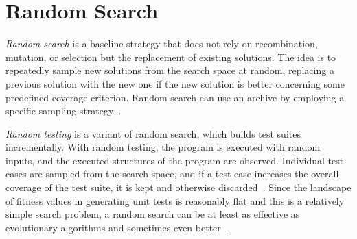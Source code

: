 \documentclass[paper=a4,%
  twoside,%
  BCOR4mm,%
  abstract=true,%
  toc=bibliography,%
  chapterprefix=true,%
  toc=bibliographynumbered,%
  open=right,%
  english,%
  pagesize=pdftex]{scrreprt}
\begin{document}
\section{Random Search}
\emph{Random search} is a baseline strategy that does not rely on recombination, mutation, or selection but the replacement of existing solutions. The idea is to repeatedly sample new solutions from the search space at random, replacing a previous solution with the new one if the new solution is better concerning some predefined coverage criterion. Random search can use an archive by employing a specific sampling strategy~\cite{Campos2017}. 

\emph{Random testing} is a variant of random search, which builds test suites incrementally. With random testing, the program is executed with random inputs, and the executed structures of the program are observed. Individual test cases are sampled from the search space, and if a test case increases the overall coverage of the test suite, it is kept and otherwise discarded~\cite{Campos2017}. Since the landscape of fitness values in generating unit tests is reasonably flat and this is a relatively simple search problem, a random search can be at least as effective as evolutionary algorithms and sometimes even better~\cite{Shamshiri2015a}.
\end{document}
